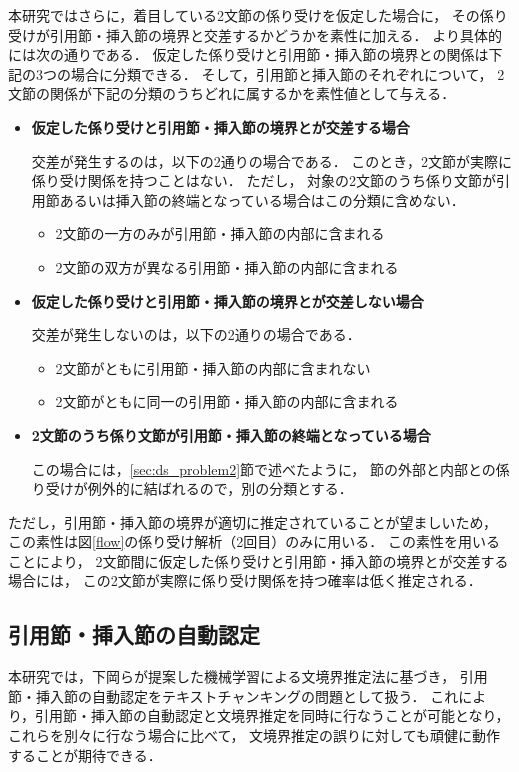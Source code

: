 \documentclass[japanese]{jnlp_1.4}
\begin{document}
本研究ではさらに，着目している2文節の係り受けを仮定した場合に，
その係り受けが引用節・挿入節の境界と交差するかどうかを素性に加える．
より具体的には次の通りである．
仮定した係り受けと引用節・挿入節の境界との関係は下記の3つの場合に分類できる．
そして，引用節と挿入節のそれぞれについて，
2文節の関係が下記の分類のうちどれに属するかを素性値として与える．
\begin{itemize}
\item
{\bf 仮定した係り受けと引用節・挿入節の境界とが交差する場合}

交差が発生するのは，以下の2通りの場合である．
このとき，2文節が実際に係り受け関係を持つことはない．
ただし，
対象の2文節のうち係り文節が引用節あるいは挿入節の終端となっている場合はこの分類に含めない．
  \begin{itemize}
  \item 2文節の一方のみが引用節・挿入節の内部に含まれる
  \item 2文節の双方が異なる引用節・挿入節の内部に含まれる
  \end{itemize}
\item {\bf 仮定した係り受けと引用節・挿入節の境界とが交差しない場合}

交差が発生しないのは，以下の2通りの場合である．
  \begin{itemize}
  \item 2文節がともに引用節・挿入節の内部に含まれない
  \item 2文節がともに同一の引用節・挿入節の内部に含まれる
  \end{itemize}
\item {\bf 2文節のうち係り文節が引用節・挿入節の終端となっている場合}

この場合には，\ref{sec:ds_problem2}節で述べたように，
節の外部と内部との係り受けが例外的に結ばれるので，別の分類とする．
\end{itemize}
ただし，引用節・挿入節の境界が適切に推定されていることが望ましいため，
この素性は図\ref{flow}の係り受け解析（2回目）のみに用いる．
この素性を用いることにより，
2文節間に仮定した係り受けと引用節・挿入節の境界とが交差する場合には，
この2文節が実際に係り受け関係を持つ確率は低く推定される．


\subsection{引用節・挿入節の自動認定}\label{sec:method_cb}

本研究では，下岡らが提案した機械学習による文境界推定法\cite{shitaoka_2005}に基づき，
引用節・挿入節の自動認定をテキストチャンキングの問題として扱う．
これにより，引用節・挿入節の自動認定と文境界推定を同時に行なうことが可能となり，
これらを別々に行なう場合に比べて，
文境界推定の誤りに対しても頑健に動作することが期待できる．
\end{document}
